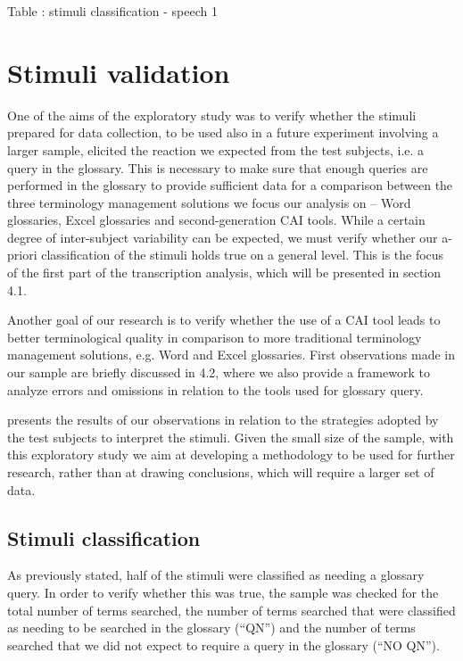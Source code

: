\documentclass[output=paper]{langsci/langscibook}
\begin{document}
\begin{stylecaption}
Table : stimuli classification - speech 1
\end{stylecaption}

\section{Stimuli validation}
One of the aims of the exploratory study was to verify whether the stimuli prepared for data collection, to be used also in a future experiment involving a larger sample, elicited the reaction we expected from the test subjects, i.e. a query in the glossary. This is necessary to make sure that enough queries are performed in the glossary to provide sufficient data for a comparison between the three terminology management solutions we focus our analysis on – Word glossaries, Excel glossaries and second-generation CAI tools. While a certain degree of inter-subject variability can be expected, we must verify whether our a-priori classification of the stimuli holds true on a general level. This is the focus of the first part of the transcription analysis, which will be presented in section 4.1.

Another goal of our research is to verify whether the use of a CAI tool leads to better terminological quality in comparison to more traditional terminology management solutions, e.g. Word and Excel glossaries. First observations made in our sample are briefly discussed in 4.2, where we also provide a framework to analyze errors and omissions in relation to the tools used for glossary query.

 presents the results of our observations in relation to the strategies adopted by the test subjects to interpret the stimuli. Given the small size of the sample, with this exploratory study we aim at developing a methodology to be used for further research, rather than at drawing conclusions, which will require a larger set of data. 

\subsection{Stimuli classification}
As previously stated, half of the stimuli were classified as needing a glossary query. In order to verify whether this was true, the sample was checked for the total number of terms searched, the number of terms searched that were classified as needing to be searched in the glossary (“QN”) and the number of terms searched that we did not expect to require a query in the glossary (“NO QN”). 
\end{document}

